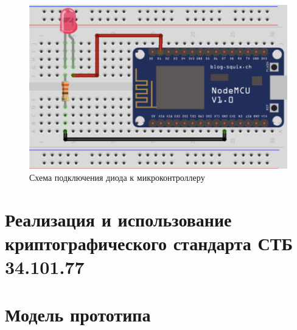 	\begin{figure}[h]
		\centering
		\includegraphics[scale=0.6]{resources/esp8266-control-led}
		\caption{Схема подключения диода к микроконтроллеру}
		\label{fig4.2}
	\end{figure}
	
	
	\section{Реализация и использование криптографического стандарта СТБ 34.101.77}
	
	\section{Модель прототипа}
	